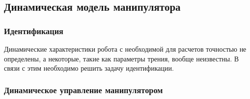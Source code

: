 \subsection{Динамическая модель манипулятора}\label{part_dynamic_model}


\subsubsection{Идентификация}
Динамические характеристики робота с необходимой для расчетов точностью не определены, а некоторые, такие как параметры трения, вообще неизвестны. В связи с этим необходимо решить задачу идентификации.


\subsubsection{Динамическое управление манипулятором}\label{part_dynamic_control}






